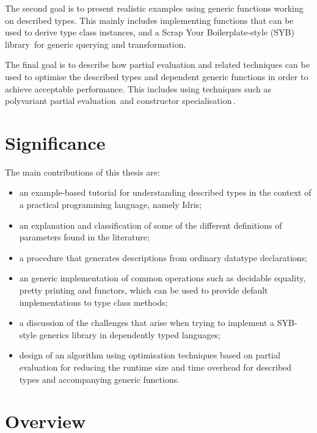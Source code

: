 \documentclass{ituthesis}
\theoremstyle{break}
\begin{document}
The second goal is to present realistic examples using generic functions working on described types. 
This mainly includes implementing functions that can be used to derive type class instances, and a Scrap Your Boilerplate-style (SYB) library\,\autocite{lammel2003scrap,mitchell2014uniplate} for generic querying and transformation.

The final goal is to describe how partial evaluation and related techniques can be used to optimise the described types and dependent generic functions in order to achieve acceptable performance.
This includes using techniques such as polyvariant partial evaluation\,\autocite{Jones:1993:PEA:153676} and constructor specialisation\,\autocite{Mogensen:1993:CS:154630.154633}. %

\section{Significance}
\label{sec:Significance}
The main contributions of this thesis are:

\begin{itemize}
  \item an example-based tutorial for understanding described types in the context of a practical programming language, namely Idris;
    \item an explanation and classification of some of the different definitions of parameters found in the literature;
    \item a procedure that generates descriptions from ordinary datatype declarations;
  \item an generic implementation of common operations such as decidable equality, pretty printing and functors, which can be used to provide default implementations to type class methods;
  \item a discussion of the challenges that arise when trying to implement a SYB-style generics library in dependently typed languages;
  \item design of an algorithm using optimisation techniques based on partial evaluation for reducing the runtime size and time overhead for described types and accompanying generic functions.
\end{itemize}
\section{Overview}
\label{sec:Overview}
\end{document}
